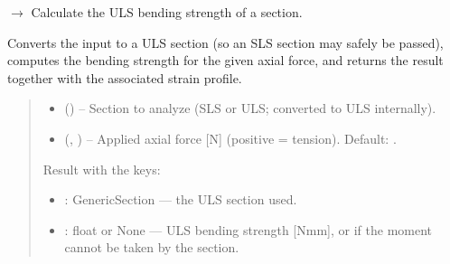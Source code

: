 \documentclass[a4paper,11pt,german]{sphinxmanual}
\begin{document}
\begin{fulllineitems}
\label{\detokenize{api/analysis_core:core.analysis_core.section_methods.calculate_bending_strength_uls_Nmm_EC}}
\pysigstartsignatures
\pysiglinewithargsret
{}
{\sphinxparamcomma {}}
{{ $\rightarrow$ }}
\pysigstopsignatures
\sphinxAtStartPar
Calculate the ULS bending strength of a section.

\sphinxAtStartPar
Converts the input to a ULS section (so an SLS section may safely be
passed), computes the bending strength for the given axial force, and
returns the result together with the associated strain profile.
\begin{quote}\begin{description}
\begin{itemize}
\item {} 
\sphinxAtStartPar
{} () – Section to analyze (SLS or ULS; converted to ULS internally).

\item {} 
\sphinxAtStartPar
{} (, ) – Applied axial force {[}N{]} (positive = tension). Default: .

\end{itemize}

\sphinxAtStartPar

\sphinxAtStartPar
Result with the keys:
\begin{itemize}
\item {} 
\sphinxAtStartPar
{} : GenericSection — the ULS section used.

\item {} 
\sphinxAtStartPar
{} : float or None — ULS bending strength {[}Nmm{]}, or 
if the moment cannot be taken by the section.


\end{itemize}
\end{description}
\end{quote}
\end{fulllineitems}
\end{document}
